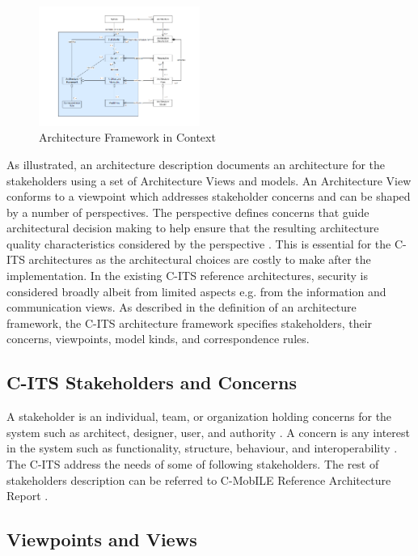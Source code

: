 \documentclass[letterpaper, 10 pt, conference]{ieeeconf}  %
\begin{document}
\begin{figure}[ht!]
	\centering
	\includegraphics[width=0.47\textwidth]{arch_framework}
	\caption{Architecture Framework in Context}
	\label{arch_frmework}
	\centering
\end{figure}

As illustrated, an architecture description documents an architecture for the stakeholders using a set of Architecture Views and models. An Architecture View conforms to a viewpoint which addresses stakeholder concerns and can be shaped by a number of perspectives. The perspective defines concerns that guide architectural decision making to help ensure that the resulting architecture quality characteristics considered by the perspective \cite{woods}. This is essential for the C-ITS architectures as the architectural choices are costly to make after the implementation. In the existing C-ITS reference architectures, security is considered broadly albeit from limited aspects e.g. from the information and communication views. As described in the definition of an architecture framework, the C-ITS architecture framework specifies stakeholders, their concerns, viewpoints, model kinds, and correspondence rules.

\subsection{C-ITS Stakeholders and Concerns}

A stakeholder is an individual, team, or organization holding concerns for the system such as architect, designer, user, and authority \cite{iso42010}. A concern is any interest in the system such as functionality, structure, behaviour, and interoperability \cite{iso42010}. The C-ITS address the needs of some of following stakeholders. The rest of stakeholders description can be referred to C-MobILE Reference Architecture Report \cite{d31}.



\subsection{Viewpoints and Views}
\end{document}
